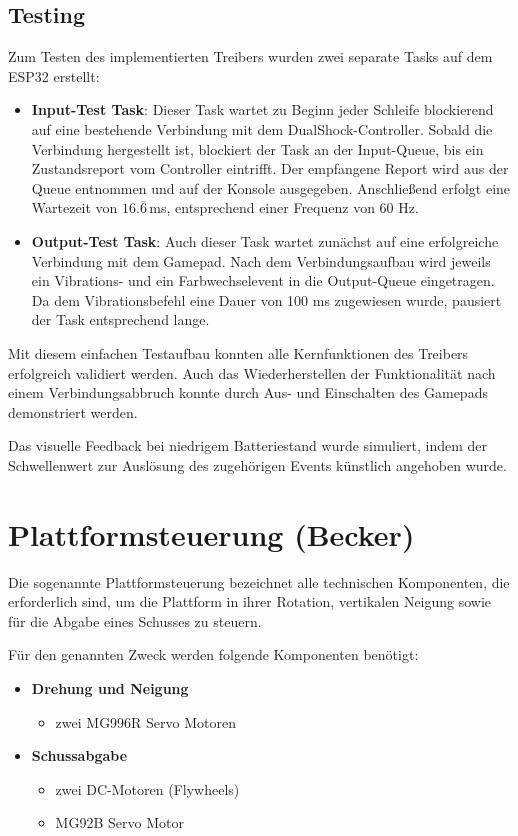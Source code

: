 \subsection{Testing}

Zum Testen des implementierten Treibers wurden zwei separate Tasks auf dem ESP32 erstellt:

\begin{itemize}
    \item \textbf{Input-Test Task}: Dieser Task wartet zu Beginn jeder Schleife blockierend auf eine bestehende Verbindung mit dem DualShock-Controller. 
    Sobald die Verbindung hergestellt ist, blockiert der Task an der Input-Queue, bis ein Zustandsreport vom Controller eintrifft. Der empfangene Report wird aus der Queue entnommen und auf der Konsole ausgegeben. 
    Anschließend erfolgt eine Wartezeit von $16.\overline{6}$\,ms, entsprechend einer Frequenz von 60 Hz.
    
    \item \textbf{Output-Test Task}: Auch dieser Task wartet zunächst auf eine erfolgreiche Verbindung mit dem Gamepad. 
    Nach dem Verbindungsaufbau wird jeweils ein Vibrations- und ein Farbwechselevent in die Output-Queue eingetragen. 
    Da dem Vibrationsbefehl eine Dauer von 100 ms zugewiesen wurde, pausiert der Task entsprechend lange.
\end{itemize}

Mit diesem einfachen Testaufbau konnten alle Kernfunktionen des Treibers erfolgreich validiert werden. 
Auch das Wiederherstellen der Funktionalität nach einem Verbindungsabbruch konnte durch Aus- und Einschalten des Gamepads demonstriert werden.

Das visuelle Feedback bei niedrigem Batteriestand wurde simuliert, indem der Schwellenwert zur Auslösung des zugehörigen Events künstlich angehoben wurde.

\section{Plattformsteuerung (Becker)}

Die sogenannte Plattformsteuerung bezeichnet alle technischen Komponenten, die erforderlich sind, um die Plattform in ihrer Rotation, vertikalen Neigung sowie für die Abgabe eines Schusses zu steuern.

Für den genannten Zweck werden folgende Komponenten benötigt:

\begin{itemize}
    \item \textbf{Drehung und Neigung}
    \begin{itemize}
        \item zwei MG996R Servo Motoren
    \end{itemize}
    \item \textbf{Schussabgabe}
    \begin{itemize}
        \item zwei DC-Motoren (Flywheels)
        \item MG92B Servo Motor
    \end{itemize}
\end{itemize}

